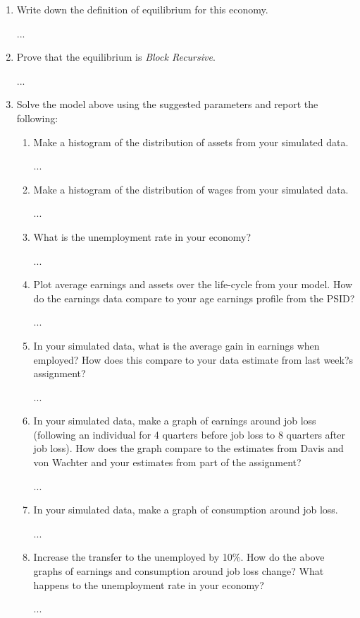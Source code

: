 \documentclass{article}
\begin{document}
\begin{enumerate}

\item Write down the definition of equilibrium for this economy.

...
 
\item Prove that the equilibrium is \textit{Block Recursive}.

...

\item Solve the model above using the suggested parameters and report the following:

\begin{enumerate}

\item Make a histogram of the distribution of assets from your simulated data.

...

\item Make a histogram of the distribution of wages from your simulated data.

...

\item What is the unemployment rate in your economy?

...

\item Plot average earnings and assets over the life-cycle from your model. How do the earnings data compare to your age earnings profile from the PSID?

...

\item In your simulated data, what is the average gain in earnings when employed? How does this compare to your data estimate from last week?s assignment?

...

\item In your simulated data, make a graph of earnings around job loss (following an individual for 4 quarters before job loss to 8 quarters after job loss). How does the graph compare to the estimates from Davis and von Wachter and your estimates from part of the assignment?

...

\item In your simulated data, make a graph of consumption around job loss.

...

\item Increase the transfer to the unemployed by 10\%. How do the above graphs of earnings and consumption around job loss change? What happens to the unemployment rate in your economy?

...

\end{enumerate}

\end{enumerate}
\end{document}
